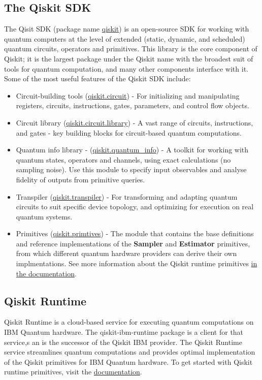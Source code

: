 \documentclass[12pt, oneside]{book}
\theoremstyle{definition}
\theoremstyle{definition}
\theoremstyle{remark}
\begin{document}
\subsection{The Qiskit SDK}
The Qisit SDK (package name \href{https://pypi.org/project/qiskit/}{qiskit}) is an open-source SDK for working with quantum computers at the level of extended (static, dynamic, and scheduled) quantum circuits, operators and primitives. This library is the core component of Qiskit; it is the largest package under the Qiskit name with the broadest suit of tools for quantum computation, and many other components interface with it.
Some of the most useful features of the Qiskit SDK include:
\begin{itemize}
    \item Circuit-building tools (\href{https://docs.quantum.ibm.com/api/qiskit/circuit}{qiskit.circuit}) - For initializing and manipulating registers, circuits, instructions, gates, parameters, and control flow objects.
    \item Circuit library (\href{https://docs.quantum.ibm.com/api/qiskit/circuit_library}{qiskit.circuit.library}) - A vast range of circuits, instructions, and gates - key building blocks for circuit-based quantum computations.
    \item Quantum info library - (\href{https://docs.quantum.ibm.com/api/qiskit/quantum_info}{qiskit.quantum\_info}) - A toolkit for working with quantum states, operators and channels, using exact calculations (no sampling noise). Use this module to specify input observables and analyse fidelity of outputs from primitive queries.
    \item Transpiler (\href{https://docs.quantum.ibm.com/api/qiskit/transpiler}{qiskit.transpiler}) - For transforming and adapting quantum circuits to suit specific device topology, and optimizing for execution on real quantum systems.
    \item Primitives (\href{https://docs.quantum.ibm.com/api/qiskit/transpiler}{qiskit.primtives}) - The module that contains the base definitions and reference implementations of the \textbf{Sampler} and \textbf{Estimator} primitives, from which different quantum hardware providers can derive their own implmentations. See more information about the Qiskit runtime primitives \href{https://docs.quantum.ibm.com/guides/primitives}{in the documentation}.
\end{itemize}
\subsection{Qiskit Runtime}
Qiskit Runtime is a cloud-based service for executing quantum computations on IBM Quantum hardware. The qiskit-ibm-runtime package is a client for that service,s an is the successor of the Qiskit IBM provider. The Qiskit Runtime service streamlines quantum computations and provides optimal implementation of the Qiskit primitives for IBM Quantum hardware. To get started with Qiskit runtime primitives, visit the \href{https://docs.quantum.ibm.com/guides/primitives}{documentation}.
\end{document}
